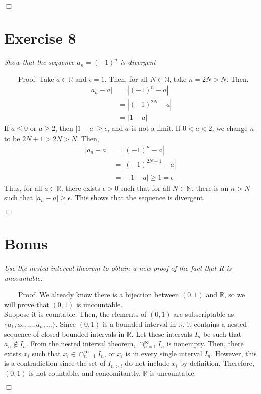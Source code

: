\documentclass[
]{article}
\begin{document}
\hfill \(\Box\)

\hypertarget{exercise-8}{%
\section{Exercise 8}\label{exercise-8}}

\emph{Show that the sequence \(a_n = (-1)^n\) is divergent}

~~~~Proof. Take \(a \in \mathbb{R}\) and \(\epsilon = 1\). Then, for all
\(N \in \mathbb{N}\), take \(n = 2N > N\). Then,
\[\begin{aligned}|a_n - a| &= |(-1)^n - a| \\ 
&=|(-1)^{2N} - a| \\
&= |1 - a|\end{aligned}\] If \(a \leq 0\) or \(a \geq 2\), then
\(|1-a| \geq \epsilon\), and \(a\) is not a limit. If \(0 < a < 2\), we
change \(n\) to be \(2N + 1 > 2N > N\). Then,
\[\begin{aligned}|a_n - a| &= |(-1)^n - a| \\ 
&=|(-1)^{2N+1} - a| \\
&= |-1 - a| \geq 1 = \epsilon \end{aligned}\] Thus, for all
\(a \in \mathbb{R}\), there exists \(\epsilon > 0\) such that for all
\(N \in \mathbb{N}\), there is an \(n > N\) such that
\(|a_n - a| \geq \epsilon\). This shows that the sequence is divergent.

\hfill \(\Box\)

\hypertarget{bonus}{%
\section{Bonus}\label{bonus}}

\emph{Use the nested interval theorem to obtain a new proof of the fact
that R is uncountable.}

~~~~Proof. We already know there is a bijection between \((0, 1)\) and
\(\mathbb{R}\), so we will prove that \((0, 1)\) is uncountable.\\
\hspace*{0.333em}\hspace*{0.333em}\hspace*{0.333em}\hspace*{0.333em}Suppose
it is countable. Then, the elements of \((0, 1)\) are subscriptable as
\(\{a_1, a_2, \dots, a_n, \dots\}\). Since \((0, 1)\) is a bounded
interval in \(\mathbb{R}\), it contains a nested sequence of closed
bounded intervals in \(\mathbb{R}\). Let these intervals \(I_n\) be such
that \(a_n \notin I_n\). From the nested interval theorem,
\(\cap ^\infty _{n=1} I_n\) is nonempty. Then, there exists \(x_i\) such
that \(x_i \in \cap ^\infty _{n=1} I_n\), or \(x_i\) is in every single
interval \(I_n\). However, this is a contradiction since the set of
\(I_{n > i}\) do not include \(x_i\) by definition. Therefore,
\((0, 1)\) is not countable, and concomitantly, \(\mathbb{R}\) is
uncountable.

\hfill \(\Box\)
\end{document}
